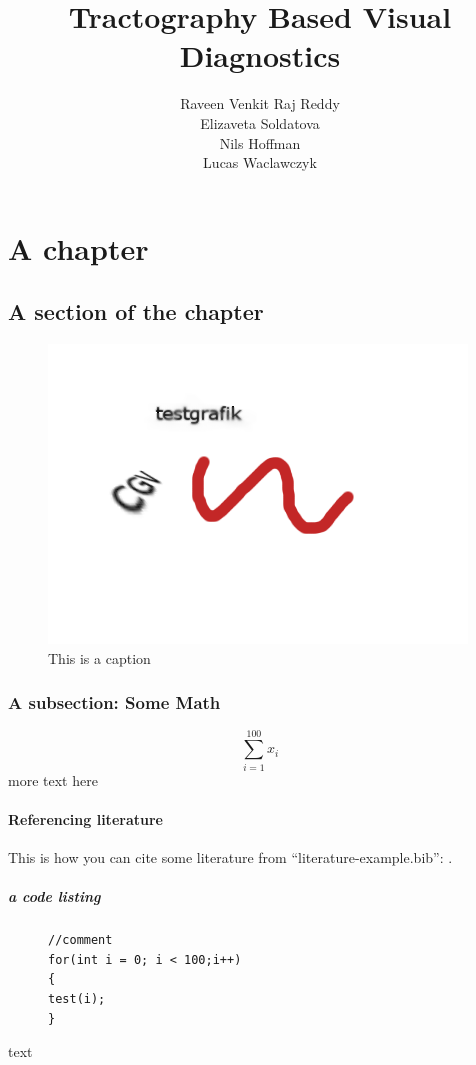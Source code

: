 \documentclass[plainreport]{cgvpub}
\author{Raveen Venkit Raj Reddy\\Elizaveta Soldatova\\Nils Hoffman\\Lucas Waclawczyk}
\title{Tractography Based Visual Diagnostics}
\begin{document}
\chapter{A chapter}
\section{A section of the chapter}
\begin{figure}[htbp]
	\centering
		\includegraphics{test.png}
	\caption{This is a caption}
	\label{fig:label-of-fig}
\end{figure}


\subsection{A subsection: Some Math}

\[
\sum_{i=1}^{100}x_i
\]
more text here
\subsubsection{Referencing literature}
This is how you can cite some literature from "`literature-example.bib"': \cite{kochbuch}.
\paragraph{a code listing}


\begin{figure}[htbp]
\begin{lstlisting}[frame=trbl]
//comment
for(int i = 0; i < 100;i++)
{
test(i);
}
\end{lstlisting}
\end{figure}

text

\cite*{}
\end{document}
